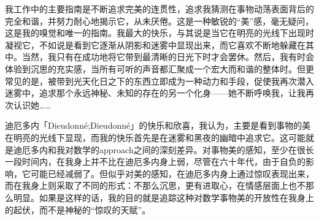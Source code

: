 我工作中的主要指南是不断追求完美的连贯性，追求我猜测在事物动荡表面背后的完全和谐，并努力耐心地揭示它，从未厌倦。这是一种敏锐的``美''感，毫无疑问，这是我的嗅觉和唯一的指南。我最大的快乐，与其说是当它在明亮的光线下出现时凝视它，不如说是看到它逐渐从阴影和迷雾中显现出来，而它喜欢不断地躲藏在其中。当然，我只有在成功地将它带到最清晰的日光下时才会罢休。然后，我有时会体验到沉思的充实感，当所有可听的声音都汇聚成一个宏大而和谐的整体时。但更常见的是，被带到光天化日之下的东西立即成为一种动力和手段，促使我再次潜入迷雾中，追求那个永远神秘、未知的存在的另一个化身——她不断呼唤我，让我再次认识她……

迪厄多内「Dieudonné;Dieudonné」的快乐和欣喜，我认为，主要是看到事物的美在明亮的光线下显现，而我的快乐首先是在迷雾和黑夜的幽暗中追求它。这可能就是迪厄多内和我对数学的approach之间的深刻差异。对事物美的感知，至少在很长一段时间内，在我身上并不比在迪厄多内身上弱，尽管在六十年代，由于自负的影响，它可能已经减弱了。但似乎对美的感知，在迪厄多内身上通过惊叹表现出来，而在我身上则采取了不同的形式：不那么沉思，更有进取心，在情感层面上也不那么明显。如果是这样的话，我的目的就是追踪这种对数学事物美的开放性在我身上的起伏，而不是神秘的``惊叹的天赋''。
